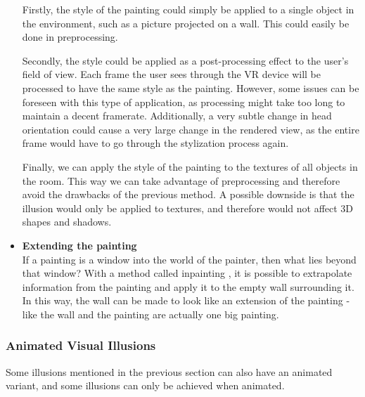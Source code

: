\documentclass[a4paper]{article}
\begin{document}
\begin{itemize}
Firstly, the style of the painting could simply be applied to a single object in the environment, such as a picture projected on a wall. This could easily be done in preprocessing. 

Secondly, the style could be applied as a post-processing effect to the user's field of view. Each frame the user sees through the VR device will be processed to have the same style as the painting. However, some issues can be foreseen with this type of application, as processing might take too long to maintain a decent framerate. Additionally, a very subtle change in head orientation could cause a very large change in the rendered view, as the entire frame would have to go through the stylization process again. 

Finally, we can apply the style of the painting to the textures of all objects in the room. This way we can take advantage of preprocessing and therefore avoid the drawbacks of the previous method. A possible downside is that the illusion would only be applied to textures, and therefore would not affect 3D shapes and shadows.

\item{\textbf{Extending the painting}}
\\If a painting is a window into the world of the painter, then what lies beyond that window? With a method called inpainting \cite{inpainting}, it is possible to extrapolate information from the painting and apply it to the empty wall surrounding it. In this way, the wall can be made to look like an extension of the painting - like the wall and the painting are actually one big painting.

\end{itemize}

\subsubsection{Animated Visual Illusions}\label{sec:animeffects}

Some illusions mentioned in the previous section can also have an animated variant, and some illusions can only be achieved when animated.
\end{document}
